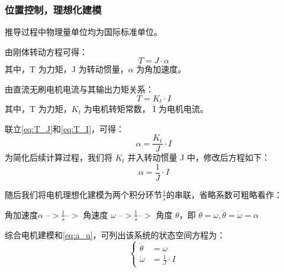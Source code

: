 \documentclass[12pt]{article}
\begin{document}
        \subsubsection{位置控制，理想化建模}
        推导过程中物理量单位均为国际标准单位。
        \par
        由刚体转动方程可得：
            \begin{equation}
                T = J \cdot \alpha
                \label{eq:T_J}
            \end{equation}
        其中，T 为力矩，J 为转动惯量，$\alpha$ 为角加速度。
        \par
        由直流无刷电机电流与其输出力矩关系：
            \begin{equation}
                T = K_t \cdot I
                \label{eq:T_I}
            \end{equation}
        其中，T 为力矩，$K_t$ 为电机转矩常数， I 为电机电流。
        \par
        联立\cref{eq:T_J}和\cref{eq:T_I}，可得：
            \begin{equation}
                \alpha = \frac{K_t}{J} \cdot I
                \label{eq:a_I}
            \end{equation}
        为简化后续计算过程，我们将 $K_t$ 并入转动惯量 J 中，修改后方程如下：
            \begin{equation}
                \alpha = \frac{1}{J} \cdot I
                \label{eq:a_u}
            \end{equation}
        \par
        随后我们将电机理想化建模为两个积分环节$\frac{1}{s}$的串联，省略系数可粗略看作：
        \par
        角加速度$\alpha$ --$>\frac{1}{s}$--$>$ 角速度 $\omega$ --$>\frac{1}{s}$--$>$ 角度 $\theta$，即 $ \dot{\theta} = \omega , \ddot{\theta} = \dot{\omega} =  \alpha$
        \par
        综合电机建模和\cref{eq:a_u}，可列出该系统的状态空间方程为：
            \begin{equation}
                    \left\{
                    \begin{aligned}
                    \dot{\theta} &= \omega \\
                    \dot{\omega} &= \frac{1}{J} \cdot I
                    \end{aligned}
                    \right.
                \label{eq:theta}
            \end{equation}
\end{document}
